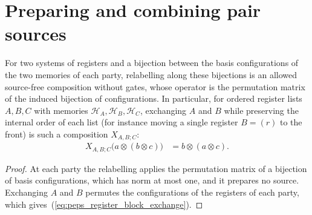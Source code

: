 \section{Preparing and combining pair sources}
\label{sec:peps_source_preparation}

\begin{lemma}
    \label{thm:peps_register_exchange}
    \leanok
    For two systems of registers and a bijection between the basis
    configurations of the two memories of each party, relabelling along these
    bijections is an allowed source-free composition without gates, whose
    operator is the permutation matrix of the induced bijection of
    configurations. In particular, for ordered register lists $A,B,C$ with
    memories $\mathcal H_A,\mathcal H_B,\mathcal H_C$, exchanging $A$ and $B$
    while preserving the internal order of each list (for instance moving a
    single register $B=(r)$ to the front) is such a composition $X_{A,B;C}$:
    \begin{align}
        X_{A,B;C}\bigl(a\otimes(b\otimes c)\bigr)
         & =b\otimes(a\otimes c).
        \label{eq:peps_register_block_exchange}
    \end{align}
\end{lemma}

\begin{proof}\leanok
    At each party the relabelling applies the permutation matrix of a
    bijection of basis configurations, which has norm at most one, and it
    prepares no source. Exchanging $A$ and $B$ permutes the configurations
    of the registers of each party, which gives~(\ref{eq:peps_register_block_exchange}).
\end{proof}


